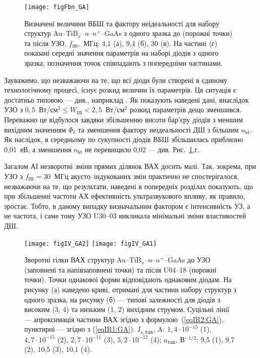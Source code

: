 \documentclass[a4paper,14pt,oneside,openany]{memoir}
\begin{document}
\begin{figure}
\center
\texttt{[image: figFbn\_GA]}%
\caption{\label{figFbn_GA}
Визначені величини ВБШ та фактору неідеальності для набору структур Au--TiB$_x$--$n$--$n^+$--GaAs
з одного зразка до (порожні точки) та після УЗО.
$f_\mathtt{US}$,~МГц: 4,1 (а), 9,4 (б), 30 (в).
На частині (г) показані середні значення параметрів на наборі діодів з одного зразка,
позначення точок співпадають з попередніми частинами.
}
\end{figure}

Зауважимо, що незважаючи на те, що всі діоди були створені в єдиному технологічному процесі,
існує розкид величин їх параметрів.
Ця ситуація є достатньо типовою --- див., наприклад \cite{SBD:rizn,Milenin1994}.
Як показують наведені дані, внаслідок УЗО з $0,5$~Вт/см$^2\leq W_\mathtt{US}<2,5$~Вт/см$^2$
розкид параметрів дещо зменшився.
Переважно це відбулося завдяки збільшенню висоти бар'єру діодів з меншим вихідним значенням $\Phi_b$ та
зменшення фактору неідеальності ДШ з більшим $n_\mathrm{id}$.
Як наслідок, в середньому по сукупності діодів ВБШ збільшилась приблизно 0,01~еВ, а зменшення $n_\mathrm{id}$ не
перевищило 0,02 --- див. Рис.~\ref{figFbn_GA},г.

Загалом АІ незворотні зміни прямих ділянок ВАХ досить малі.
Так, зокрема, при УЗО з $f_\mathtt{US}=30$~МГц акусто--індукованих змін практично не спостерігалося,
незважаючи на те, що результати, наведені в попередніх розділах показують, що при збільшенні частоти АХ
ефективність ультразвукового впливу, як правило, зростає.
Тобто, в даному випадку визначальним фактором є інтенсивність УЗ, а не частота, і саме тому УЗО U30--03
викликала мінімальні зміни властивостей ДШ.

\begin{figure}
\center
\texttt{[image: figIV\_GA2]} \hfill
\texttt{[image: figIV\_GA1]}
\caption{\label{figIV_GA}
Зворотні гілки ВАХ структур Au--TiB$_x$--$n$--$n^+$--GaAs
до УЗО (заповнені та напівзаповнені точки)
та після U04--18 (порожні точки).
Точки однакової форми відповідають однаковим діодам.
На рисунку (а) наведено криві, отримані для частини набору структур з одного зразка,
на рисунку (б) --- типові залежності для діодів з високим (3, 4) та низьким (1, 2)
вихідним струмом.
Суцільні лінії --- апроксимація частини ВАХ згідно з формулою~(\ref{eqIR2:GA}),
пунктирні  --- згідно з (\ref{eqIR1:GA}).
$I_{s,\mathtt{tun}}$, A: $1,4\cdot10^{-15}$ (1), $4,7\cdot10^{-15}$ (2), $2,7\cdot10^{-11}$ (3), $5,2\cdot10^{-12}$ (4);
$a_\mathtt{tun}$, В$^{-1/2}$: 9,5 (1), 9,7 (2), 10,5 (3), 10,1 (4).
}%
\end{figure}
\end{document}

